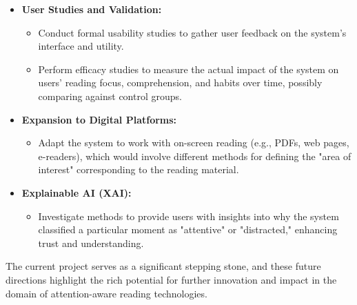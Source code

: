 \begin{itemize}
\begin{itemize}
    \end{itemize}
    \item \textbf{User Studies and Validation:}
    \begin{itemize}
        \item Conduct formal usability studies to gather user feedback on the system's interface and utility.
        \item Perform efficacy studies to measure the actual impact of the system on users' reading focus, comprehension, and habits over time, possibly comparing against control groups.
    \end{itemize}
    \item \textbf{Expansion to Digital Platforms:}
    \begin{itemize}
        \item Adapt the system to work with on-screen reading (e.g., PDFs, web pages, e-readers), which would involve different methods for defining the "area of interest" corresponding to the reading material.
    \end{itemize}
    \item \textbf{Explainable AI (XAI):}
    \begin{itemize}
        \item Investigate methods to provide users with insights into why the system classified a particular moment as "attentive" or "distracted," enhancing trust and understanding.
    \end{itemize}
\end{itemize}
The current project serves as a significant stepping stone, and these future directions highlight the rich potential for further innovation and impact in the domain of attention-aware reading technologies.

